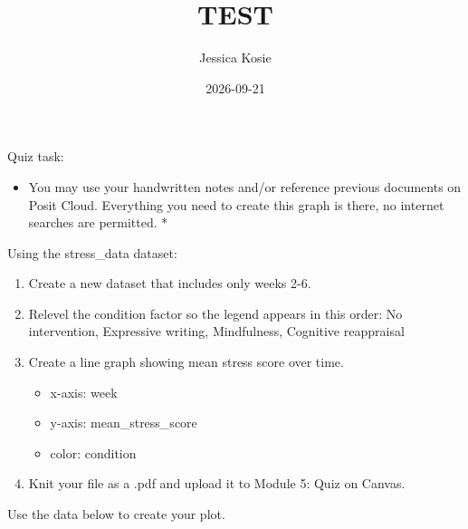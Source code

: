 \documentclass[
]{article}
\title{TEST}
\author{Jessica Kosie}
\date{2026-09-21}
\providecommand{\tightlist}{%
  \setlength{\itemsep}{0pt}\setlength{\parskip}{0pt}}
\begin{document}
\maketitle

Quiz task:

\begin{itemize}
\tightlist
\item
  You may use your handwritten notes and/or reference previous documents
  on Posit Cloud. Everything you need to create this graph is there, no
  internet searches are permitted. *
\end{itemize}

Using the stress\_data dataset:

\begin{enumerate}
\def\labelenumi{\arabic{enumi}.}
\tightlist
\item
  Create a new dataset that includes only weeks 2-6.
\item
  Relevel the condition factor so the legend appears in this order: No
  intervention, Expressive writing, Mindfulness, Cognitive reappraisal
\item
  Create a line graph showing mean stress score over time.

  \begin{itemize}
  \tightlist
  \item
    x-axis: week
  \item
    y-axis: mean\_stress\_score
  \item
    color: condition
  \end{itemize}
\item
  Knit your file as a .pdf and upload it to Module 5: Quiz on Canvas.
\end{enumerate}

Use the data below to create your plot.
\end{document}
